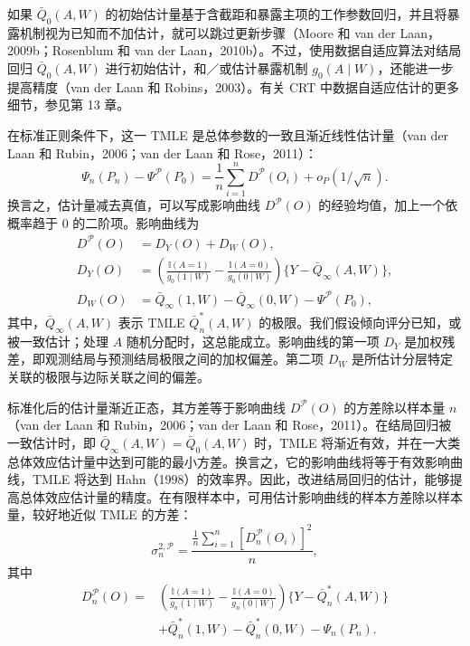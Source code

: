 如果 $\bar Q_0(A,W)$ 的初始估计量基于含截距和暴露主项的工作参数回归，并且将暴露机制视为已知而不加估计，就可以跳过更新步骤（Moore 和 van der Laan，2009b；Rosenblum 和 van der Laan，2010b）。不过，使用数据自适应算法对结局回归 $\bar Q_0(A,W)$ 进行初始估计，和／或估计暴露机制 $g_0(A\mid W)$，还能进一步提高精度（van der Laan 和 Robins，2003）。有关 CRT 中数据自适应估计的更多细节，参见第 13 章。

在标准正则条件下，这一 TMLE 是总体参数的一致且渐近线性估计量（van der Laan 和 Rubin，2006；van der Laan 和 Rose，2011）：
\[
\Psi_n(P_n)-\Psi^{\mathcal P}(P_0)
=\frac1n\sum_{i=1}^nD^{\mathcal P}(O_i)+o_P(1/\sqrt n).
\]
换言之，估计量减去真值，可以写成影响曲线 $D^{\mathcal P}(O)$ 的经验均值，加上一个依概率趋于 0 的二阶项。影响曲线为
\[
\begin{aligned}
D^{\mathcal P}(O)&=D_Y(O)+D_W(O),\\
D_Y(O)&=\left(\frac{\mathbb I(A=1)}{g_0(1\mid W)}
-\frac{\mathbb I(A=0)}{g_0(0\mid W)}\right)\{Y-\bar Q_\infty(A,W)\},\\
D_W(O)&=\bar Q_\infty(1,W)-\bar Q_\infty(0,W)-\Psi^{\mathcal P}(P_0),
\end{aligned}
\]
其中，$\bar Q_\infty(A,W)$ 表示 TMLE $\bar Q_n^*(A,W)$ 的极限。我们假设倾向评分已知，或被一致估计；处理 $A$ 随机分配时，这总能成立。影响曲线的第一项 $D_Y$ 是加权残差，即观测结局与预测结局极限之间的加权偏差。第二项 $D_W$ 是所估计分层特定关联的极限与边际关联之间的偏差。

标准化后的估计量渐近正态，其方差等于影响曲线 $D^{\mathcal P}(O)$ 的方差除以样本量 $n$（van der Laan 和 Rubin，2006；van der Laan 和 Rose，2011）。在结局回归被一致估计时，即 $\bar Q_\infty(A,W)=\bar Q_0(A,W)$ 时，TMLE 将渐近有效，并在一大类总体效应估计量中达到可能的最小方差。换言之，它的影响曲线将等于有效影响曲线，TMLE 将达到 Hahn（1998）的效率界。因此，改进结局回归的估计，能够提高总体效应估计量的精度。在有限样本中，可用估计影响曲线的样本方差除以样本量，较好地近似 TMLE 的方差：
\[
\sigma_n^{2,\mathcal P}
=\frac{\frac1n\sum_{i=1}^n[D_n^{\mathcal P}(O_i)]^2}{n},
\]
其中
\[
\begin{aligned}
D_n^{\mathcal P}(O)
={}&\left(\frac{\mathbb I(A=1)}{g_n(1\mid W)}
-\frac{\mathbb I(A=0)}{g_n(0\mid W)}\right)\{Y-\bar Q_n^*(A,W)\}\\
&+\bar Q_n^*(1,W)-\bar Q_n^*(0,W)-\Psi_n(P_n).
\end{aligned}
\]
